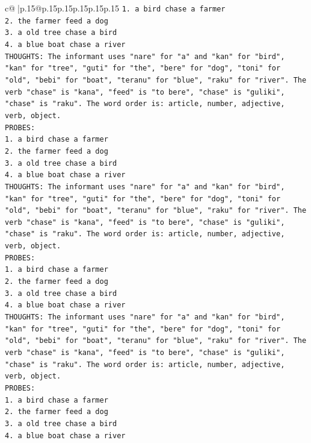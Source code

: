 \documentclass{article}
\begin{document}
{\begin{supertabular}{c@{$\;$}|p{.15\linewidth}@{}p{.15\linewidth}p{.15\linewidth}p{.15\linewidth}p{.15\linewidth}p{.15\linewidth}}
{{{\texttt{1. a bird chase a farmer} \\
\texttt{2. the farmer feed a dog} \\
\texttt{3. a old tree chase a bird} \\
\texttt{4. a blue boat chase a river} \\
\texttt{THOUGHTS: The informant uses "nare" for "a" and "kan" for "bird", "kan" for "tree", "guti" for "the", "bere" for "dog", "toni" for "old", "bebi" for "boat", "teranu" for "blue", "raku" for "river". The verb "chase" is "kana", "feed" is "to bere", "chase" is "guliki", "chase" is "raku". The word order is: article, number, adjective, verb, object.} \\
\texttt{PROBES:} \\
\texttt{1. a bird chase a farmer} \\
\texttt{2. the farmer feed a dog} \\
\texttt{3. a old tree chase a bird} \\
\texttt{4. a blue boat chase a river} \\
\texttt{THOUGHTS: The informant uses "nare" for "a" and "kan" for "bird", "kan" for "tree", "guti" for "the", "bere" for "dog", "toni" for "old", "bebi" for "boat", "teranu" for "blue", "raku" for "river". The verb "chase" is "kana", "feed" is "to bere", "chase" is "guliki", "chase" is "raku". The word order is: article, number, adjective, verb, object.} \\
\texttt{PROBES:} \\
\texttt{1. a bird chase a farmer} \\
\texttt{2. the farmer feed a dog} \\
\texttt{3. a old tree chase a bird} \\
\texttt{4. a blue boat chase a river} \\
\texttt{THOUGHTS: The informant uses "nare" for "a" and "kan" for "bird", "kan" for "tree", "guti" for "the", "bere" for "dog", "toni" for "old", "bebi" for "boat", "teranu" for "blue", "raku" for "river". The verb "chase" is "kana", "feed" is "to bere", "chase" is "guliki", "chase" is "raku". The word order is: article, number, adjective, verb, object.} \\
\texttt{PROBES:} \\
\texttt{1. a bird chase a farmer} \\
\texttt{2. the farmer feed a dog} \\
\texttt{3. a old tree chase a bird} \\
\texttt{4. a blue boat chase a river} \\
}}}
\end{supertabular}}
\end{document}
